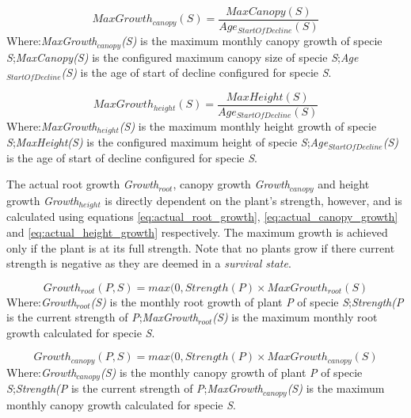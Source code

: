 \begin{equation}
MaxGrowth_{canopy}(S) = \frac{MaxCanopy(S)}{Age_{StartOfDecline}(S)}
\label{eq:max_canopy_growth}
\end{equation}
Where:\textit{MaxGrowth$_{canopy}$(S)} is the maximum monthly canopy growth of specie \textit{S};\textit{MaxCanopy(S)} is the configured maximum canopy size of specie \textit{S};\textit{Age$_{StartOfDecline}$(S)} is the age of start of decline configured for specie \textit{S}.

\begin{equation}
MaxGrowth_{height}(S) = \frac{MaxHeight(S)}{Age_{StartOfDecline}(S)}
\label{eq:max_height_growth}
\end{equation}
Where:\textit{MaxGrowth$_{height}$(S)} is the maximum monthly height growth of specie \textit{S};\textit{MaxHeight(S)} is the configured maximum height of specie \textit{S};\textit{Age$_{StartOfDecline}$(S)} is the age of start of decline configured for specie \textit{S}.

The actual root growth \textit{Growth$_{root}$}, canopy growth \textit{Growth$_{canopy}$} and height growth \textit{Growth$_{height}$} is directly dependent on the plant's strength, however, and is calculated using equations \ref{eq:actual_root_growth}, \ref{eq:actual_canopy_growth} and \ref{eq:actual_height_growth} respectively. The maximum growth is achieved only if the plant is at its full strength. Note that no plants grow if there current strength is negative as they are deemed in a \textit{survival state}.

\begin{equation}
Growth_{root}(\textit{P},S) = max(0, Strength(\textit{P}) \times  MaxGrowth_{root}(S)
\label{eq:actual_root_growth}
\end{equation}
Where:\textit{Growth$_{root}$(S)} is the monthly root growth of plant \textit{P} of specie \textit{S};\textit{Strength(\textit{P}} is the current strength of \textit{P};\textit{MaxGrowth$_{root}$(S)} is the maximum monthly root growth calculated for specie \textit{S}.

\begin{equation}
Growth_{canopy}(\textit{P},S) = max(0, Strength(\textit{P}) \times  MaxGrowth_{canopy}(S)
\label{eq:actual_canopy_growth}
\end{equation}
Where:\textit{Growth$_{canopy}$(S)} is the monthly canopy growth of plant \textit{P} of specie \textit{S};\textit{Strength(\textit{P}} is the current strength of \textit{P};\textit{MaxGrowth$_{canopy}$(S)} is the maximum monthly canopy growth calculated for specie \textit{S}.

